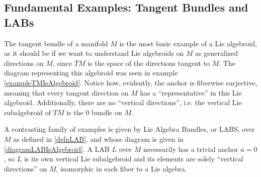 \subsection{Fundamental Examples: Tangent Bundles and LABs}

The tangent bundle of a manifold $M$ is the most basic example of a Lie algebroid, as it should be if we want to understand Lie algebroids on $M$ as generalized directions on $M$, since $TM$ is the space of the directions tangent to $M$. The diagram representing this algebroid was seen in example \ref{exampleTMIsAlgebroid}. 
Notice how, evidently, the anchor is fiberwise surjective, meaning that every tangent direction on $M$ has a ``representative'' in this Lie algebroid. Additionally, there are no ``vertical directions'', i.e. the vertical Lie subalgebroid of $TM$ is the $0$ bundle on $M$.

A contrasting family of examples is given by Lie Algebra Bundles, or LABS, over $M$ as defined in \ref{defnLAB}, and whose diagram is given in \eqref{diagramLABIsAlgebroid}. A LAB $L$ over $M$ necessarily has a trivial anchor $a = 0$, so $L$ is its own vertical Lie subalgebroid and its elements are solely ``vertical directions'' on $M$, isomorphic in each fiber to a Lie algebra.






